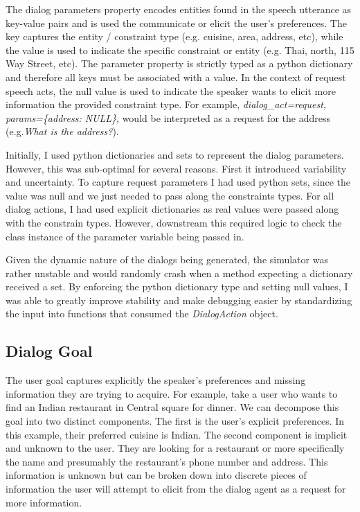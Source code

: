 The dialog parameters property encodes entities found in the speech utterance as key-value pairs and is used the communicate or elicit the user's preferences. The key captures the entity / constraint type (e.g. cuisine, area, address, etc), while the value is used to indicate the specific constraint or entity (e.g. Thai, north, 115 Way Street, etc). The parameter property is strictly typed as a python dictionary and therefore all keys must be associated with a value. In the context of request speech acts, the null value is used to indicate the speaker wants to elicit more information the provided constraint type. For example, \textit{dialog\_act=request, params=\{address: NULL\}}, would be interpreted as a request for the address (e.g.\textit{What is the address?}). 

Initially, I used python dictionaries and sets to represent the dialog parameters. However, this was sub-optimal for several reasons. First it introduced variability and uncertainty. To capture request parameters I had used python sets, since the value was null and we just needed to pass along the constraints types. For all dialog actions, I had used explicit dictionaries as real values were passed along with the constrain types. However, downstream this required logic to check the class instance of the parameter variable being passed in. 

Given the dynamic nature of the dialogs being generated, the simulator was rather unstable and would randomly crash when a method expecting a dictionary received a set. By enforcing the python dictionary type and setting null values, I was able to greatly improve stability and make debugging easier by standardizing the input into functions that consumed the \textit{DialogAction} object. 
\clearpage

\subsection{Dialog Goal}
\label{sec:dialog_goal}

The user goal captures explicitly the speaker's preferences and missing information they are trying to acquire. For example, take a user who wants to find an Indian restaurant in Central square for dinner. We can decompose this goal into two distinct components. The first is the user's explicit preferences. In this example, their preferred cuisine is Indian. The second component is implicit and unknown to the user. They are looking for a restaurant or more specifically the name and presumably the restaurant's phone number and address. This information is unknown but can be broken down into discrete pieces of information the user will attempt to elicit from the dialog agent as a request for more information. 

